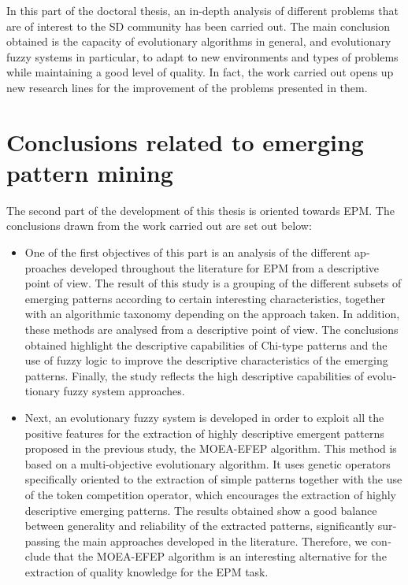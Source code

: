 \documentclass[c5paper,10pt,twoside]{book}	   	%
\begin{document}
\begin{otherlanguage}{british}
In this part of the doctoral thesis, an in-depth analysis of different problems that are of interest to the \ac{SD} community has been carried out. The main conclusion obtained is the capacity of evolutionary algorithms in general, and evolutionary fuzzy systems in particular, to adapt to new environments and types of problems while maintaining a good level of quality. In fact, the work carried out opens up new research lines for the improvement of the problems presented in them.

\section{Conclusions related to emerging pattern mining}

The second part of the development of this thesis is oriented towards \ac{EPM}. The conclusions drawn from the work carried out are set out below:

\begin{itemize}
	\item One of the first objectives of this part is an analysis of the different approaches developed throughout the literature for \ac{EPM} from a descriptive point of view. The result of this study is a grouping of the different subsets of emerging patterns according to certain interesting characteristics, together with an algorithmic taxonomy depending on the approach taken. In addition, these methods are analysed from a descriptive point of view. The conclusions obtained highlight the descriptive capabilities of Chi-type patterns and the use of fuzzy logic to improve the descriptive characteristics of the emerging patterns. Finally, the study reflects the high descriptive capabilities of evolutionary fuzzy system approaches.
	
	\item Next, an evolutionary fuzzy system is developed in order to exploit all the positive features for the extraction of highly descriptive emergent patterns proposed in the previous study, the MOEA-EFEP algorithm. This method is based on a multi-objective evolutionary algorithm. It uses genetic operators specifically oriented to the extraction of simple patterns together with the use of the token competition operator, which encourages the extraction of highly descriptive emerging patterns. The results obtained show a good balance between generality and reliability of the extracted patterns, significantly surpassing the main approaches developed in the literature. Therefore, we conclude that the MOEA-EFEP algorithm is an interesting alternative for the extraction of quality knowledge for the \ac{EPM} task.
	

\end{itemize}
\end{otherlanguage}
\end{document}
